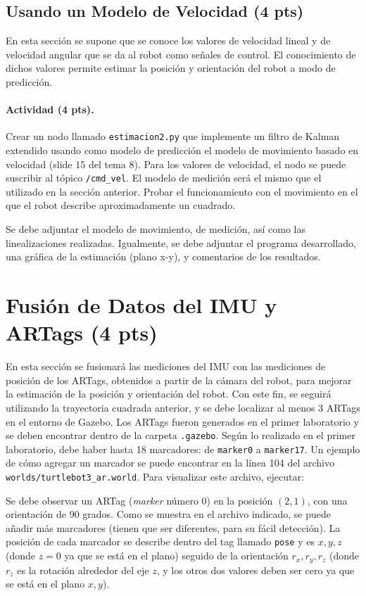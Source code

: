 \documentclass[a4paper,11pt]{robotlabs}
\begin{document}
\subsection{Usando un Modelo de Velocidad (4 pts)}

En esta sección se supone que se conoce los valores de velocidad lineal y de
velocidad angular que se da al robot como señales de control. El conocimiento
de dichos valores permite estimar la posición y orientación del robot a modo de
predicción. 

\paragraph{Actividad (4 pts).} 
Crear un nodo llamado \texttt{estimacion2.py} que implemente un filtro de
Kalman extendido usando como modelo de predicción el modelo de movimiento
basado en velocidad (slide 15 del tema 8). Para los valores de velocidad, el
nodo se puede suscribir al tópico \texttt{/cmd\_vel}. El modelo de medición
será el mismo que el utilizado en la sección anterior. Probar el funcionamiento
con el movimiento en el que el robot describe aproximadamente un cuadrado.

Se debe adjuntar el modelo de movimiento, de medición, así como las
linealizaciones realizadas. Igualmente, se debe adjuntar el programa
desarrollado, una gráfica de la estimación (plano x-y), y comentarios de los
resultados.

\section{Fusión de Datos del IMU y ARTags (4 pts)}

En esta sección se fusionará las mediciones del IMU con las mediciones de
posición de los ARTags, obtenidos a partir de la cámara del robot, para
mejorar la estimación de la posición y orientación del robot. Con este fin, se
seguirá utilizando la trayectoria cuadrada anterior, y se debe localizar al
menos 3 ARTags en el entorno de Gazebo. Los ARTags fueron generados en el
primer laboratorio y se deben encontrar dentro de la carpeta
\texttt{.gazebo}. Según lo realizado en el primer laboratorio, debe haber hasta
18 marcadores: de \texttt{marker0} a \texttt{marker17}. Un ejemplo de cómo
agregar un marcador se puede encontrar en la línea 104 del archivo
\texttt{worlds/turtlebot3\_ar.world}. Para visualizar este archivo, ejecutar:
\noindent Se debe observar un ARTag (\textit{marker} número 0) en la posición
$(2,1)$, con una orientación de 90 grados. Como se muestra en el archivo
indicado, se puede añadir más marcadores (tienen que ser diferentes, para su
fácil detección). La posición de cada marcador se describe dentro del tag
llamado \texttt{pose} y es $x, y, z$ (donde $z=0$ ya que se está en el plano)
seguido de la orientación $r_x, r_y, r_z$ (donde $r_z$ es la rotación alrededor del
eje $z$, y los otros dos valores deben ser cero ya que se está en el plano
$x,y$). 
\end{document}
